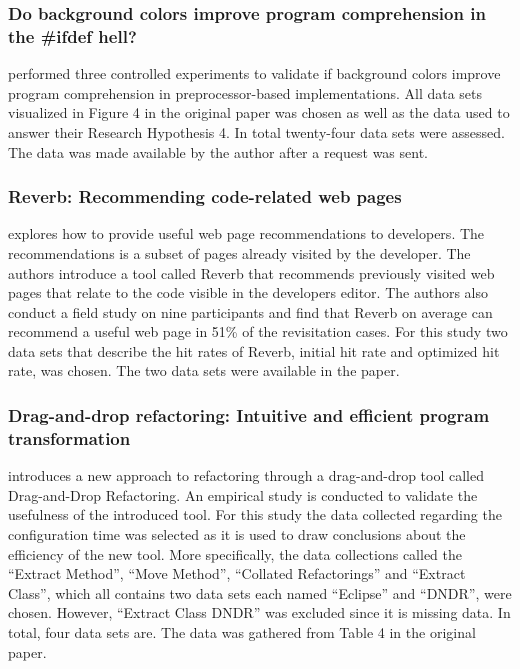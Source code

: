 \subsubsection{Do background colors improve program comprehension in the \#ifdef hell?}
\citet{feigenspan2013background} performed three controlled experiments to validate if background colors improve program comprehension in preprocessor-based implementations. All data sets visualized in Figure 4 in the original paper \citep{feigenspan2013background} was chosen as well as the data used to answer their Research Hypothesis 4. In total twenty-four data sets were assessed. The data was made available by the author after a request was sent.




\subsubsection{Reverb: Recommending code-related web pages}
\citet{sawadsky2013reverb} explores how to provide useful web page recommendations to developers. The recommendations is a subset of pages already visited by the developer. The authors introduce a tool called Reverb that recommends previously visited web pages that relate to the code visible in the developers editor. The authors also conduct a field study on nine participants and find that Reverb on average can recommend a useful web page in 51\% of the revisitation cases. For this study two data sets that describe the hit rates of Reverb, initial hit rate and optimized hit rate, was chosen. The two data sets were available in the paper.




\subsubsection{Drag-and-drop refactoring: Intuitive and efficient program transformation}
\label{sec:resultsprestudy-lee2013drag}
\citet{lee2013drag} introduces a new approach to refactoring through a drag-and-drop tool called Drag-and-Drop Refactoring. An empirical study is conducted to validate the usefulness of the introduced tool. For this study the data collected regarding the configuration time was selected as it is used to draw conclusions about the efficiency of the new tool. More specifically, the data collections called the ``Extract Method'', ``Move Method'', ``Collated Refactorings'' and ``Extract Class'', which all contains two data sets each named ``Eclipse'' and ``DNDR'', were chosen. However, ``Extract Class DNDR'' was excluded since it is missing data. In total, four data sets are. The data was gathered from Table 4 in the original paper.




